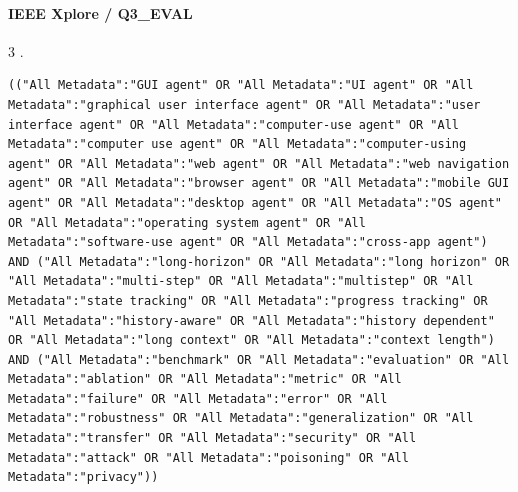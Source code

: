 \noindent\begin{minipage}{\linewidth}
\paragraph{IEEE Xplore / Q3\_EVAL}
3 .
\begin{lstlisting}
(("All Metadata":"GUI agent" OR "All Metadata":"UI agent" OR "All Metadata":"graphical user interface agent" OR "All Metadata":"user interface agent" OR "All Metadata":"computer-use agent" OR "All Metadata":"computer use agent" OR "All Metadata":"computer-using agent" OR "All Metadata":"web agent" OR "All Metadata":"web navigation agent" OR "All Metadata":"browser agent" OR "All Metadata":"mobile GUI agent" OR "All Metadata":"desktop agent" OR "All Metadata":"OS agent" OR "All Metadata":"operating system agent" OR "All Metadata":"software-use agent" OR "All Metadata":"cross-app agent") AND ("All Metadata":"long-horizon" OR "All Metadata":"long horizon" OR "All Metadata":"multi-step" OR "All Metadata":"multistep" OR "All Metadata":"state tracking" OR "All Metadata":"progress tracking" OR "All Metadata":"history-aware" OR "All Metadata":"history dependent" OR "All Metadata":"long context" OR "All Metadata":"context length") AND ("All Metadata":"benchmark" OR "All Metadata":"evaluation" OR "All Metadata":"ablation" OR "All Metadata":"metric" OR "All Metadata":"failure" OR "All Metadata":"error" OR "All Metadata":"robustness" OR "All Metadata":"generalization" OR "All Metadata":"transfer" OR "All Metadata":"security" OR "All Metadata":"attack" OR "All Metadata":"poisoning" OR "All Metadata":"privacy"))
\end{lstlisting}
\end{minipage}\par\medskip

